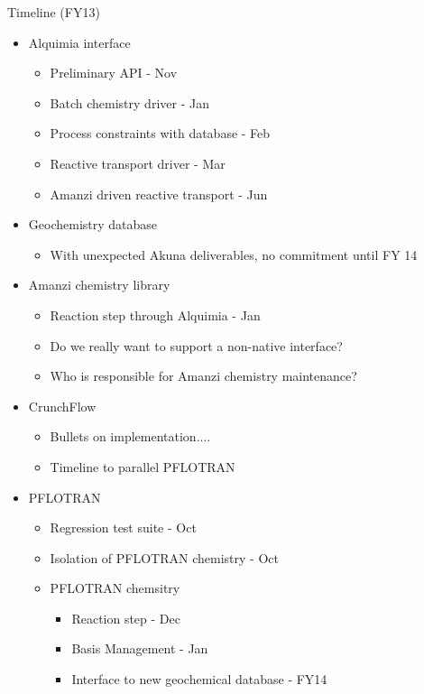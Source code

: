 \documentclass{beamer}
\newcommand{\pft}{PFLOTRAN\xspace}
\newcommand\gehcomment[1]{{{\color{orange} #1}}}
\begin{document}
\begin{frame}[allowframebreaks]{Timeline (FY13)}
\begin{itemize}
\item Alquimia interface
\begin{itemize}
\item Preliminary API - Nov
\item Batch chemistry driver - Jan
\item Process constraints with database - Feb
\item Reactive transport driver - Mar
\item Amanzi driven reactive transport - Jun
\end{itemize}
\item Geochemistry database
\begin{itemize}
\item With unexpected Akuna deliverables, no commitment until FY 14
\end{itemize}

\newpage

\item Amanzi chemistry library
\begin{itemize}
\item Reaction step through Alquimia - Jan
\item \gehcomment{Do we really want to support a non-native interface?}
\item \gehcomment{Who is responsible for Amanzi chemistry maintenance?}
\end{itemize}
\item CrunchFlow
\begin{itemize}
\item Bullets on implementation....
\item Timeline to parallel \pft
\end{itemize}
\item \pft
\begin{itemize}
\item Regression test suite - Oct
\item Isolation of \pft chemistry - Oct
\item \pft chemsitry
\begin{itemize}
\item Reaction step - Dec
\item Basis Management - Jan
\item Interface to new geochemical database - FY14
\end{itemize}
\end{itemize}
\end{itemize}
\end{frame}
\end{document}
